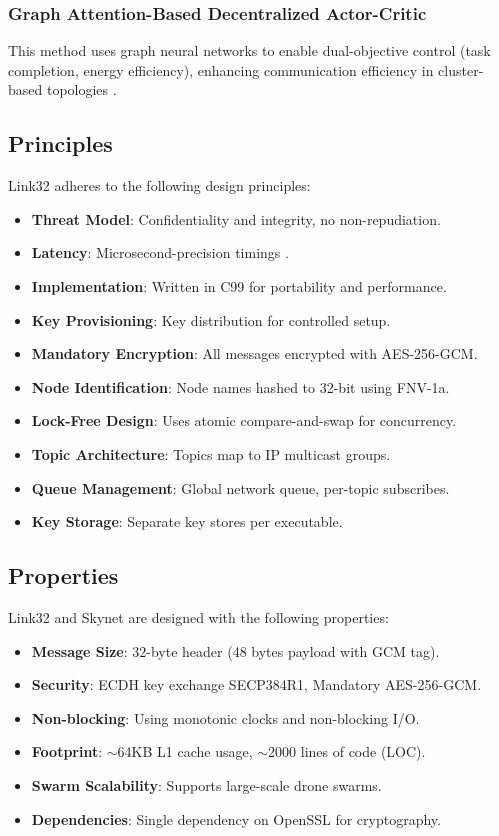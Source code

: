 \documentclass{article}
\begin{document}
\subsubsection{Graph Attention-Based Decentralized Actor-Critic}
This method uses graph neural networks to enable dual-objective control (task completion, energy efficiency), enhancing communication efficiency in cluster-based topologies \cite{Zhang2020, Wang2021}.


\subsection{Principles}
Link32 adheres to the following design principles:
\begin{itemize}
    \item \textbf{Threat Model}: Confidentiality and integrity, no non-repudiation.
    \item \textbf{Latency}: Microsecond-precision timings .
    \item \textbf{Implementation}: Written in C99 for portability and performance.
    \item \textbf{Key Provisioning}: Key distribution for controlled setup.
    \item \textbf{Mandatory Encryption}: All messages encrypted with AES-256-GCM.
    \item \textbf{Node Identification}: Node names hashed to 32-bit using FNV-1a.
    \item \textbf{Lock-Free Design}: Uses atomic compare-and-swap for concurrency.
    \item \textbf{Topic Architecture}: Topics map to IP multicast groups.
    \item \textbf{Queue Management}: Global network queue, per-topic subscribes.
    \item \textbf{Key Storage}: Separate key stores per executable.
\end{itemize}

\newpage

\subsection{Properties}
Link32 and Skynet are designed with the following properties:
\begin{itemize}
    \item \textbf{Message Size}: 32-byte header (48 bytes payload with GCM tag).
    \item \textbf{Security}: ECDH key exchange SECP384R1, Mandatory AES-256-GCM.
    \item \textbf{Non-blocking}: Using monotonic clocks and non-blocking I/O.
    \item \textbf{Footprint}: $\sim$64KB L1 cache usage, $\sim$2000 lines of code (LOC).
    \item \textbf{Swarm Scalability}: Supports large-scale drone swarms.
    \item \textbf{Dependencies}: Single dependency on OpenSSL for cryptography.
\end{itemize}
\end{document}

